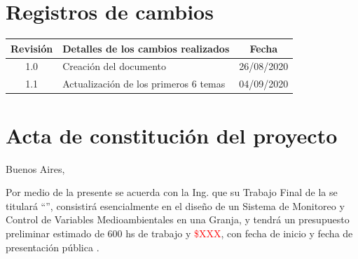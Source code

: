 \documentclass[11pt]{charter}
\begin{document}
\maketitle
\thispagestyle{empty}
\pagebreak


\thispagestyle{empty}
{\setlength{\parskip}{0pt}
\tableofcontents{}
}
\pagebreak


\section{Registros de cambios}
\label{sec:registro}


\begin{table}[ht]
\label{tab:registro}
\centering
\begin{tabularx}{\linewidth}{@{}|c|X|c|@{}}
\hline
\rowcolor[HTML]{C0C0C0} 
Revisión & \multicolumn{1}{c|}{\cellcolor[HTML]{C0C0C0}Detalles de los cambios realizados} & Fecha      \\ \hline
1.0      & Creación del documento                                          & 26/08/2020 \\ \hline
1.1      & Actualización de los primeros 6 temas                           & 04/09/2020 \\ \hline
\end{tabularx}
\end{table}

\pagebreak

\section{Acta de constitución del proyecto}
\label{sec:acta}

\begin{flushright}
Buenos Aires, 
\end{flushright}

\vspace{2cm}

Por medio de la presente se acuerda con la Ing. \authorname\hspace{1px} que su Trabajo Final de la \degreename\hspace{1px} se titulará ``\ttitle'', consistirá esencialmente en el diseño de un Sistema de Monitoreo y Control de Variables Medioambientales en una Granja, y tendrá un presupuesto preliminar estimado de 600 hs de trabajo  y \textcolor{red}{\$XXX}, con fecha de inicio \hspace{1px} y fecha de presentación pública \fechaFinalName.
\end{document}
